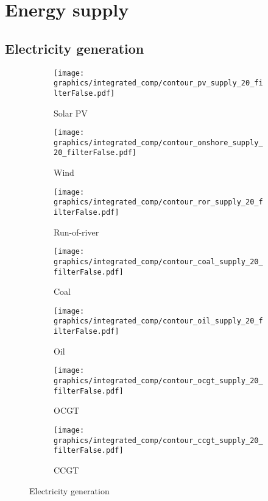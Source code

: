 
\clearpage

\section{Energy supply}
\subsection{Electricity generation}

\begin{figure*}[h] %
    \centering
    \begin{subfigure}[b]{0.45\linewidth}
        \centering
        \texttt{[image: graphics/integrated\_comp/contour\_pv\_supply\_20\_filterFalse.pdf]}
        \caption{Solar PV}
    \end{subfigure}
    \hfill
    \begin{subfigure}[b]{0.45\linewidth}
        \centering
        \texttt{[image: graphics/integrated\_comp/contour\_onshore\_supply\_20\_filterFalse.pdf]}
        \caption{Wind}
    \end{subfigure}
    \hfill
    \begin{subfigure}[b]{0.45\linewidth}
        \centering
        \texttt{[image: graphics/integrated\_comp/contour\_ror\_supply\_20\_filterFalse.pdf]}
        \caption{Run-of-river}
    \end{subfigure}
    \hfill
    \begin{subfigure}[b]{0.45\linewidth}
        \centering
        \texttt{[image: graphics/integrated\_comp/contour\_coal\_supply\_20\_filterFalse.pdf]}
        \caption{Coal}
    \end{subfigure}
    \hfill
    \begin{subfigure}[b]{0.45\linewidth}
        \centering
        \texttt{[image: graphics/integrated\_comp/contour\_oil\_supply\_20\_filterFalse.pdf]}
        \caption{Oil}
    \end{subfigure}
    \hfill
    \begin{subfigure}[b]{0.45\linewidth}
        \centering
        \texttt{[image: graphics/integrated\_comp/contour\_ocgt\_supply\_20\_filterFalse.pdf]}
        \caption{OCGT}
    \end{subfigure}
    \hfill
    \begin{subfigure}[b]{0.45\linewidth}
        \centering
        \texttt{[image: graphics/integrated\_comp/contour\_ccgt\_supply\_20\_filterFalse.pdf]}
        \caption{CCGT}
    \end{subfigure}
    \hfill

    \caption{Electricity generation}
    \label{fig:supply}
\end{figure*}


